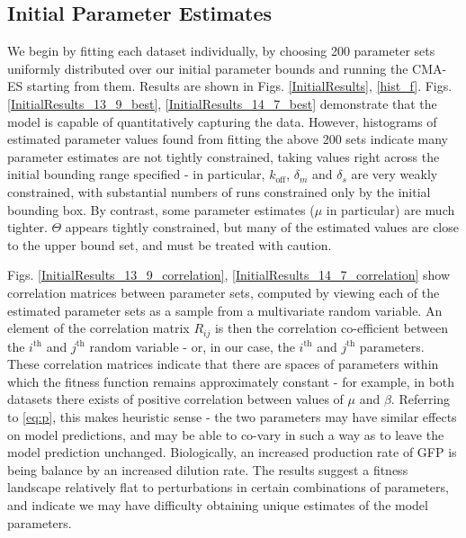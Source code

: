 \documentclass[10pt,journal]{./IEEE_latex_class/IEEEtran}
\begin{document}
\subsection{Initial Parameter Estimates}
\label{Initial Parameter Estimates}


 We begin by fitting each dataset individually, by choosing 200 parameter sets uniformly distributed over our initial parameter bounds and running the CMA-ES starting from them. Results are shown in Figs. \ref{InitialResults}, \ref{hist_f}. Figs. \ref{InitialResults_13_9_best}, \ref{InitialResults_14_7_best}  demonstrate that the model is capable of quantitatively capturing the data. However, histograms of estimated parameter values found from fitting the above 200 sets indicate many parameter estimates are not tightly constrained, taking values right across the initial bounding range specified - in particular, $k_\mathrm{off}$, $\delta_{m}$ and $\delta_{s}$ are very weakly constrained, with substantial numbers of runs constrained only by the initial bounding box. By contrast, some parameter estimates ($\mu$ in particular) are much tighter. $\Theta$ appears tightly constrained, but many of the estimated values are close to the upper bound set, and must be treated with caution.

Figs. \ref{InitialResults_13_9_correlation}, \ref{InitialResults_14_7_correlation} show correlation matrices between parameter sets, computed by viewing each of the estimated parameter sets as a sample from a multivariate random variable. An element of the correlation matrix $R_{ij}$ is then the correlation co-efficient between the $i^\mathrm{th}$ and $j^\mathrm{th}$ random variable - or, in our case, the $i^\mathrm{th}$ and $j^\mathrm{th}$ parameters. These correlation matrices indicate that there are spaces of parameters within which the fitness function remains approximately constant - for example, in both datasets there exists of positive correlation between values of $\mu$ and $\beta$. Referring to \eqref{eq:p}, this makes heuristic sense - the two parameters may have similar effects on model predictions, and may be able to co-vary in such a way as to leave the model prediction unchanged. Biologically, an increased production rate of GFP is being balance by an increased dilution rate. 
The results suggest a fitness landscape relatively flat to perturbations in certain combinations of parameters, and indicate we may have difficulty obtaining unique estimates of the model parameters.
 
\end{document}
